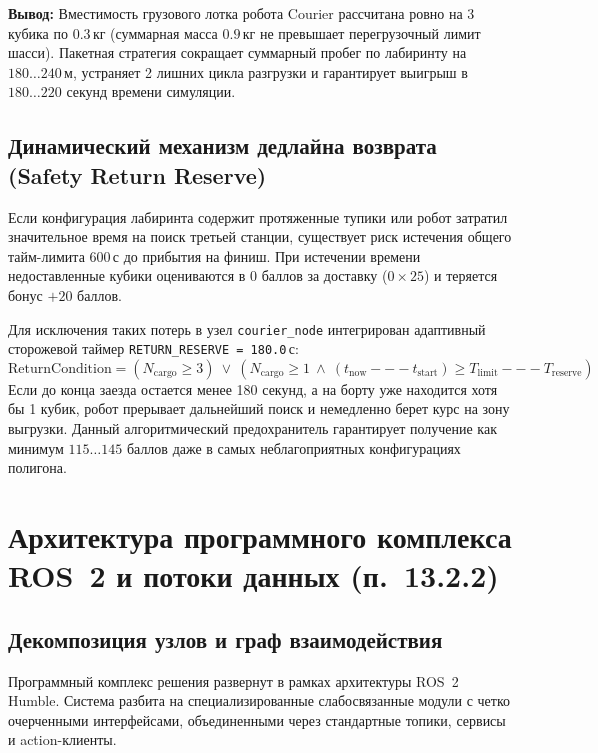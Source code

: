 \documentclass[a4paper,11pt]{article}
\begin{document}
\textbf{Вывод:} Вместимость грузового лотка робота Courier рассчитана ровно на 3 кубика по $0.3$\,кг (суммарная масса $0.9$\,кг не превышает перегрузочный лимит шасси). Пакетная стратегия сокращает суммарный пробег по лабиринту на $180\dots240$\,м, устраняет 2 лишних цикла разгрузки и гарантирует выигрыш в $180\dots220$ секунд времени симуляции.

\subsection{Динамический механизм дедлайна возврата (Safety Return Reserve)}
Если конфигурация лабиринта содержит протяженные тупики или робот затратил значительное время на поиск третьей станции, существует риск истечения общего тайм-лимита 600\,с до прибытия на финиш. При истечении времени недоставленные кубики оцениваются в $0$ баллов за доставку ($0 \times 25$) и теряется бонус $+20$ баллов.

Для исключения таких потерь в узел \texttt{courier\_node} интегрирован адаптивный сторожевой таймер \texttt{RETURN\_RESERVE = 180.0}\,с:
\begin{equation}
\text{ReturnCondition} = \left( N_{\text{cargo}} \ge 3 \right) \ \lor \ \left( N_{\text{cargo}} \ge 1 \ \land \ (t_{\text{now}} --- t_{\text{start}}) \ge T_{\text{limit}} --- T_{\text{reserve}} \right)
\label{eq:deadline}
\end{equation}
Если до конца заезда остается менее 180 секунд, а на борту уже находится хотя бы 1 кубик, робот прерывает дальнейший поиск и немедленно берет курс на зону выгрузки. Данный алгоритмический предохранитель гарантирует получение как минимум $115\dots145$ баллов даже в самых неблагоприятных конфигурациях полигона.

\section{Архитектура программного комплекса ROS~2 и потоки данных (п.~13.2.2)}

\subsection{Декомпозиция узлов и граф взаимодействия}
Программный комплекс решения развернут в рамках архитектуры ROS~2 Humble. Система разбита на специализированные слабосвязанные модули с четко очерченными интерфейсами, объединенными через стандартные топики, сервисы и action-клиенты.
\end{document}
